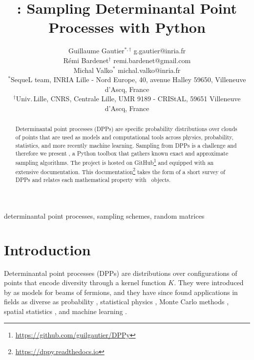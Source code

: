 \documentclass[twoside,11pt]{article}
\begin{document}
\title{\DPPy: Sampling Determinantal Point Processes with Python}

\author{\name Guillaume Gautier$^{*,\dagger}$ \email g.gautier@inria.fr \\
       \name R\'emi Bardenet$^\dagger$ \email remi.bardenet@gmail.com \\
       \name Michal Valko$^*$ \email michal.valko@inria.fr\\
       \addr $^*$SequeL team, INRIA Lille - Nord Europe,  40, avenue Halley 59650, Villeneuve d'Ascq, France\\
       \addr $^\dagger$Univ.\,Lille, CNRS, Centrale Lille, UMR 9189 - CRIStAL, 59651 Villeneuve d'Ascq, France
}

\editor{}

\maketitle

\setcounter{footnote}{3}
\begin{abstract}%
  Determinantal point processes (DPPs) are specific probability distributions over clouds of points that are used as models and computational tools across physics, probability, statistics, and more recently machine learning.
  Sampling from DPPs is a challenge and therefore we present \DPPy, a Python toolbox that gathers known exact and approximate sampling algorithms.
  The project is hosted on GitHub\footnote{\label{fn:github}\url{https://github.com/guilgautier/DPPy}} and equipped with an extensive documentation.
  This documentation\footnote{\label{fn:docs}\url{https://dppy.readthedocs.io}} takes the form of a short survey of DPPs and relates each mathematical property with \DPPy\ objects.
\end{abstract}

\begin{keywords}
  determinantal point processes,
  sampling schemes,
  random matrices
\end{keywords}

\section{Introduction} %
\label{sec:introduction}

  Determinantal point processes (DPPs) are distributions over configurations of points that encode diversity through a kernel function $K$.
  They were introduced by \citet{Mac75} as models for beams of fermions, and they have since found applications in fields as diverse as probability \citep{Sos00, Kon05, HKPV06}, statistical physics \citep{PaBe11}, Monte Carlo methods \citep{BaHa16}, spatial statistics \citep{LaMoRu15}, and machine learning \citep[ML,][]{KuTa12}.
\end{document}
